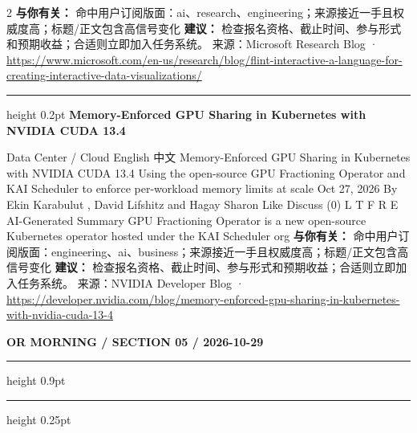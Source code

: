 \documentclass[10.5pt]{ctexart}
\begin{document}
\begin{multicols}{2}
\textbf{与你有关：} 命中用户订阅版面：ai、research、engineering；来源接近一手且权威度高；标题/正文包含高信号变化
\textbf{建议：} 检查报名资格、截止时间、参与形式和预期收益；合适则立即加入任务系统。
{\footnotesize\color{ormuted} 来源：Microsoft Research Blog · \url{https://www.microsoft.com/en-us/research/blog/flint-interactive-a-language-for-creating-interactive-data-visualizations/}}
\vspace{2mm}
\hrule height 0.2pt
\vspace{2mm}
{\large\bfseries Memory-Enforced GPU Sharing in Kubernetes with NVIDIA CUDA 13.4}\par
Data Center / Cloud English 中文 Memory-Enforced GPU Sharing in Kubernetes with NVIDIA CUDA 13.4 Using the open-source GPU Fractioning Operator and KAI Scheduler to enforce per-workload memory limits at scale Oct 27, 2026 By Ekin Karabulut , David Lifshitz and Hagay Sharon Like Discuss (0) L T F R E AI-Generated Summary GPU Fractioning Operator is a new open-source Kubernetes operator hosted under the KAI Scheduler org
\textbf{与你有关：} 命中用户订阅版面：engineering、ai、business；来源接近一手且权威度高；标题/正文包含高信号变化
\textbf{建议：} 检查报名资格、截止时间、参与形式和预期收益；合适则立即加入任务系统。
{\footnotesize\color{ormuted} 来源：NVIDIA Developer Blog · \url{https://developer.nvidia.com/blog/memory-enforced-gpu-sharing-in-kubernetes-with-nvidia-cuda-13-4}}
\end{multicols}
\newpage
{\small\bfseries OR MORNING / SECTION 05 / 2026-10-29}
\vspace{2mm}
\hrule height 0.9pt
\vspace{1.5mm}
\hrule height 0.25pt
\vspace{4mm}
\end{document}
